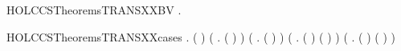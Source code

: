 \newcommand{\HOLCCSTheoremsTRANSXXASSOCXXRL}{\UseVerbatim{HOLCCSTheoremsTRANSXXASSOCXXRL}}
\begin{SaveVerbatim}{HOLCCSTheoremsTRANSXXBV}
\HOLTokenTurnstile{} \HOLSymConst{\HOLTokenForall{}}  .  \HOLTokenTransBegin{}\HOLTokenTransEnd {} \HOLSymConst{\HOLTokenImp{}}   \HOLConst{\HOLTokenSubset{}}  
\end{SaveVerbatim}
\newcommand{\HOLCCSTheoremsTRANSXXBV}{\UseVerbatim{HOLCCSTheoremsTRANSXXBV}}
\begin{SaveVerbatim}{HOLCCSTheoremsTRANSXXcases}
\HOLTokenTurnstile{} \HOLSymConst{\HOLTokenForall{}}  .
        \HOLTokenTransBegin{}\HOLTokenTransEnd {} \HOLSymConst{\HOLTokenEquiv{}}
       ( \HOLSymConst{=} ) \HOLSymConst{\HOLTokenDisj{}} (\HOLSymConst{\HOLTokenExists{}} . ( \HOLSymConst{=}  \HOLSymConst{\ensuremath{+}} ) \HOLSymConst{\HOLTokenConj{}}  \HOLTokenTransBegin{}\HOLTokenTransEnd {}) \HOLSymConst{\HOLTokenDisj{}}
       (\HOLSymConst{\HOLTokenExists{}} . ( \HOLSymConst{=}  \HOLSymConst{\ensuremath{+}} ) \HOLSymConst{\HOLTokenConj{}}  \HOLTokenTransBegin{}\HOLTokenTransEnd {}) \HOLSymConst{\HOLTokenDisj{}}
       (\HOLSymConst{\HOLTokenExists{}}  . ( \HOLSymConst{=}  \HOLSymConst{\ensuremath{\parallel}} ) \HOLSymConst{\HOLTokenConj{}} ( \HOLSymConst{=}  \HOLSymConst{\ensuremath{\parallel}} ) \HOLSymConst{\HOLTokenConj{}}  \HOLTokenTransBegin{}\HOLTokenTransEnd {}) \HOLSymConst{\HOLTokenDisj{}}
       (\HOLSymConst{\HOLTokenExists{}}  . ( \HOLSymConst{=}  \HOLSymConst{\ensuremath{\parallel}} ) \HOLSymConst{\HOLTokenConj{}} ( \HOLSymConst{=}  \HOLSymConst{\ensuremath{\parallel}} ) \HOLSymConst{\HOLTokenConj{}}  \HOLTokenTransBegin{}\HOLTokenTransEnd {}) \HOLSymConst{\HOLTokenDisj{}}

\end{SaveVerbatim}
